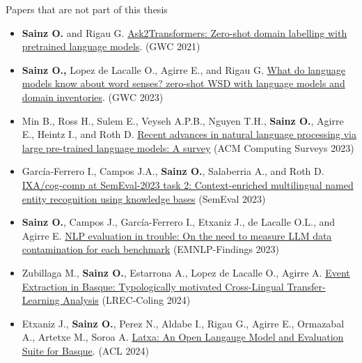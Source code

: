 \documentclass[
    11pt,
    notheorems,
    xcolor={dvipsnames},
    hyperref={
        pdfstartview=FitH, 
        pdftitle={Ikasketa-adibide urriko Informazio-Erauzketa}, 
        pdfauthor={Oscar Sainz Jimenez}, 
        citecolor=secondary, 
    }
]{beamer}
\begin{document}
\begin{frame}
    \vspace{-1em}
    \begin{block}{Papers that are not part of this thesis}

        \begin{itemize}
            \item \small{\textbf{Sainz O.} and Rigau G. \href{https://aclanthology.org/2021.gwc-1.6}{\textcolor{primary}{Ask2Transformers: Zero-shot domain labelling with pretrained language models}}. (GWC 2021)}
            \item \small{\textbf{Sainz O.,} Lopez de Lacalle O., Agirre E., and Rigau G. \href{https://aclanthology.org/2023.gwc-1.40}{\textcolor{primary}{What do language models know about word senses? zero-shot WSD with language models and domain inventories}}. (GWC 2023)}
            \item \small{Min B., Ross H., Sulem E., Veyseh A.P.B., Nguyen T.H., \textbf{Sainz O.}, Agirre E., Heintz I., and Roth D. \href{https://dl.acm.org/doi/10.1145/3605943}{\textcolor{primary}{Recent advances in natural language processing via large pre-trained language models: A survey}} (ACM Computing Surveys 2023)}
            \item \small{García-Ferrero I., Campos J.A., \textbf{Sainz O.}, Salaberria A., and Roth D. \href{https://aclanthology.org/2023.semeval-1.186}{\textcolor{primary}{IXA/cog-comp at SemEval-2023 task 2: Context-enriched multilingual named entity recognition using knowledge bases}} (SemEval 2023)}
            \item \small{\textbf{Sainz O.}, Campos J., García-Ferrero I., Etxaniz J., de Lacalle O.L., and Agirre E. \href{https://aclanthology.org/2023.findings-emnlp.722}{\textcolor{primary}{NLP evaluation in trouble: On the need to measure LLM data contamination for each benchmark}} (EMNLP-Findings 2023)}
            \item \small{Zubillaga M., \textbf{Sainz O.}, Estarrona A., Lopez de Lacalle O., Agirre A. \href{https://arxiv.org/abs/2404.06392}{\textcolor{primary}{Event Extraction in Basque: Typologically motivated Cross-Lingual Transfer-Learning Analysis}} (LREC-Coling 2024)}
            \item \small{Etxaniz J., \textbf{Sainz O.}, Perez N., Aldabe I., Rigau G., Agirre E., Ormazabal A., Artetxe M., Soroa A. \href{https://arxiv.org/abs/2403.20266}{\textcolor{primary}{Latxa: An Open Langauge Model and Evaluation Suite for Basque}}. (ACL 2024)}
        \end{itemize}
    \end{block}

\end{frame}


{
    \begin{frame}
        \titlepage
    \end{frame}
}
\end{document}

